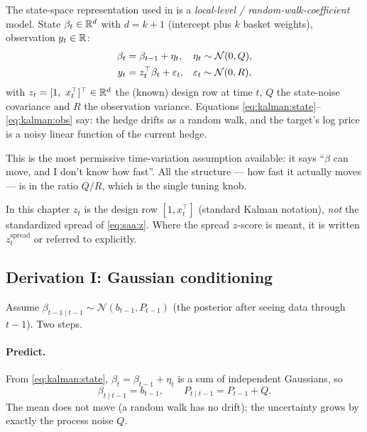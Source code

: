 The state-space representation used in  is a
\emph{local-level / random-walk-coefficient} model. State $\beta_t\in\mathbb{R}^{d}$ with
$d=k+1$ (intercept plus $k$ basket weights), observation $y_t\in\mathbb{R}$:
\begin{align}
  \beta_t &= \beta_{t-1} + \eta_t, && \eta_t\sim\mathcal N(0,Q), \label{eq:kalman:state}\\
  y_t &= z_t^{\top}\beta_t + \varepsilon_t, && \varepsilon_t\sim\mathcal N(0,R), \label{eq:kalman:obs}
\end{align}
with $z_t=[1,\ x_t^{\top}]^{\top}\in\R^{d}$ the (known) design row at time $t$, $Q$ the
state-noise covariance and $R$ the observation variance. Equations
\eqref{eq:kalman:state}--\eqref{eq:kalman:obs} say: the hedge drifts as a random walk,
and the target's log price is a noisy linear function of the current hedge.

This is the most permissive time-variation assumption available: it says ``$\beta$ can
move, and I don't know how fast''. All the structure --- how fast it actually moves ---
is in the ratio $Q/R$, which is the single tuning knob.

\begin{remark}
In this chapter $z_t$ is the design row $[1,x_t^{\top}]$ (standard Kalman notation),
\emph{not} the standardized spread of \eqref{eq:saa:z}. Where the spread $z$-score is
meant, it is written $z^{\text{spread}}_t$ or referred to explicitly.
\end{remark}

\subsection{Derivation I: Gaussian conditioning}
\label{sec:kalman:bayes}

Assume $\beta_{t-1\mid t-1}\sim\mathcal N(b_{t-1},P_{t-1})$ (the posterior after seeing
data through $t-1$). Two steps.

\paragraph{Predict.} From \eqref{eq:kalman:state}, $\beta_t = \beta_{t-1}+\eta_t$ is a sum
of independent Gaussians, so
\begin{equation}
  \beta_{t\mid t-1} = b_{t-1},
  \qquad
  P_{t\mid t-1} = P_{t-1} + Q .
  \label{eq:kalman:predict}
\end{equation}
The mean does not move (a random walk has no drift); the uncertainty grows by exactly the
process noise $Q$.

